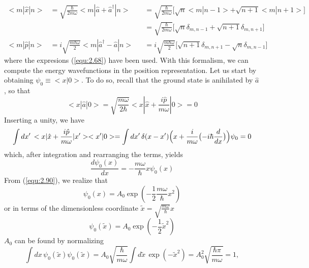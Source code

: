 \begin{subequations}
  \begin{alignat}{3}
    <m|\hat{x}|n> &= \sqrt{\frac{\hbar}{2m\omega}}
    <m|\hat{a}+ \hat{a}^{\dagger}|n> &&=
    \sqrt{\frac{\hbar}{2m\omega}} 
    \bigl[\sqrt{n}<m|n-1> + \sqrt{n+1}<m|n+1>\bigr]
    \nonumber \\
    &{}&&= \sqrt{\frac{\hbar}{2m\omega}}
    \bigl[\sqrt{n}\delta_{m , n-1} + \sqrt{n+1}\delta_{m,
    n+1}\bigr] \label{equ:2.87a} \\
    <m|\hat{p}|n> &= i \sqrt{\frac{m\hbar \omega}{2}}
    <m|\hat{a}^{\dagger} - \hat{a}|n> &&= i
    \sqrt{\frac{m\hbar\omega}{2}}
    \bigl[
      \sqrt{n+1}\delta_{m,n+1} - \sqrt{n}\delta_{m,n-1}
    \bigr]\label{equ:2.87b}
  \end{alignat}
\end{subequations}
where the expresions (\ref{equ:2.68}) have been used.
With this formalism, we can compute the energy wavefunctions
in the position representation. Let us start by obtaining
$\psi_0 \equiv <x|0>$. To do so, recall that the ground
state is anihilated by $\hat{a}$, so that
\begin{equation}
  <x|\hat{a}|0> = \sqrt{\frac{m\omega}{2\hbar}} <x|\hat{x}+
  \frac{i\hat{p}}{m\omega} |0> = 0
  \label{equ:2.88}
\end{equation}
Inserting a unity, we have
\begin{equation}
  \int dx' \, <x|\hat{x} + \frac{i\hat{p}}{m\omega}|x'>
  <x'|0> =
  \int dx' \, \delta(x - x')
  \Bigl(x + \frac{i}{m\omega}\bigl(-i\hbar
  \frac{d}{dx}\bigr)\Bigr)\psi_0 = 0
  \label{equ:2.89}
\end{equation}
which, after integration and rearranging the terms, yields
\begin{equation}
  \frac{d\psi_0(x)}{dx} = -\frac{m\omega}{\hbar} x \psi_0(x)
  \label{equ:2.90}
\end{equation}
From (\ref{equ:2.90}), we realize that
$$
\psi_0(x) = A_0 \exp(-\frac{1}{2}\frac{m\omega}{\hbar}x^2)
$$
or in terms of the dimensionless coordinate $\tilde{x} =
\sqrt{\frac{m\omega}{\hbar}}x$
\begin{equation}
  \psi_0(\tilde{x}) = A_0 \exp(-\frac{1}{2}\tilde{x}^2)
  \label{equ:2.91}
\end{equation}
$A_0$ can be found by normalizing
\begin{equation}
  \int dx \, \psi_0(\tilde{x}) \psi_0(\tilde{x}) = A_0
  \sqrt{\frac{\hbar}{m\omega}} \int d\tilde{x} \,
  \exp(-\tilde{x}^2) = A_0^2 \sqrt{\frac{\hbar\pi}{m\omega}}
  = 1, 
  \label{equ:2.92}
\end{equation}
